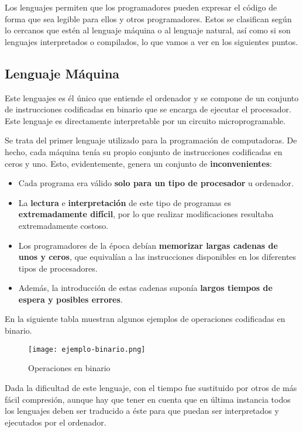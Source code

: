 Los lenguajes permiten que los programadores pueden expresar el código de forma que sea legible para ellos y otros programadores. Estos se clasifican según lo cercanos que estén al lenguaje máquina o al lenguaje natural, así como si son lenguajes interpretados o compilados, lo que vamos a ver en los siguientes puntos.

\subsection{Lenguaje Máquina}
Este lenguajes es él único que entiende el ordenador y se compone de un conjunto de instrucciones codificadas en binario que se encarga de ejecutar el procesador. Este lenguaje es directamente interpretable por un circuito microprogramable.

Se trata del primer lenguaje utilizado para la programación de computadoras. De hecho, cada máquina tenía su propio conjunto de instrucciones codificadas en ceros y uno. Esto, evidentemente, genera un conjunto de \textbf{inconvenientes}:

\begin{itemize}
    \item Cada programa era válido \textbf{solo para un tipo de procesador} u ordenador.
    \item La \textbf{lectura} e \textbf{interpretación} de este tipo de programas es \textbf{extremadamente difícil}, por lo que realizar modificaciones resultaba extremadamente costoso.
    \item Los programadores de la época debían \textbf{memorizar largas cadenas de unos y ceros}, que equivalían a las instrucciones disponibles en los diferentes tipos de procesadores.
    \item Además, la introducción de estas cadenas suponía \textbf{largos tiempos de espera y posibles errores}.
\end{itemize}

En la siguiente tabla muestran algunos ejemplos de operaciones codificadas en binario.

\begin{figure}[H]
    \centering
    \texttt{[image: ejemplo-binario.png]}
    \caption{Operaciones en binario}
\end{figure}

Dada la dificultad de este lenguaje, con el tiempo fue sustituido por otros de más fácil compresión, aunque hay que tener en cuenta que en última instancia todos los lenguajes deben ser traducido a éste para que puedan ser interpretados y ejecutados por el ordenador.

